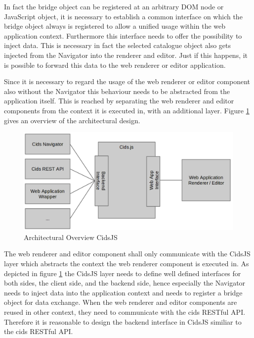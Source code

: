 In fact the bridge object can be registered at an arbitrary DOM node or JavaScript object, it is necessary to establish a common interface on which the bridge object always is registered to allow a unified usage within the web application context.
Furthermore this interface needs to offer the possibility to inject data.
This is necessary in fact the selected catalogue object also gets injected from the Navigator into the renderer and editor.
Just if this happens, it is possible to forward this data to the web renderer or editor application.

Since it is necessary to regard the usage of the web renderer or editor component also without the Navigator this  behaviour needs to be abstracted from the application itself.
This is reached by separating the web renderer and editor components from the context it is executed in, with an additional layer.
Figure \ref{fig:cidsJS} gives an overview of the architectural design.

\begin{figure}
	\centering	\includegraphics[width=1.0\textwidth]{./img/impl/cidsJS.png}
	\caption{Architectural Overview CidsJS}
	\label{fig:cidsJS}
\end{figure}

The web renderer and editor component shall only communicate with the CidsJS layer which abstracts the context the web renderer component is executed in.
As depicted in figure \ref{fig:cidsJS} the CidsJS layer needs to define well defined interfaces for both sides, the client side, and the backend side, hence especially the Navigator needs to inject data into the application context and needs to register a bridge object for data exchange.
When the web renderer and editor components are reused in other context, they need to communicate with the cids RESTful API.
Therefore it is reasonable to design the backend interface in CidsJS similiar to the cids RESTful API.

